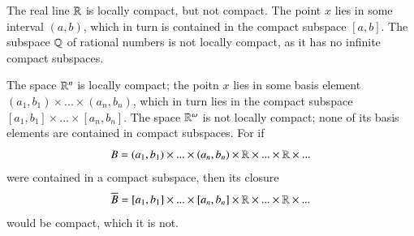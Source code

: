 \documentclass[12pt, a4paper, oneside, openright, titlepage]{book}
\begin{document}
\begin{example}
    The real line $\mathbb R$ is locally compact, but not compact. The point $x$ lies in some interval $(a,b)$, which in turn is contained in the compact subspace $[a,b]$. The subspace $\mathbb Q$ of rational numbers is not locally compact, as it has no infinite compact subspaces.
\end{example}

\begin{example}
    The space $\mathbb R^n$ is locally compact; the poitn $x$ lies in some basis element $(a_1,b_1)\times ... \times (a_n,b_n)$, which in turn lies in the compact subspace $[a_1,b_1]\times ... \times [a_n,b_n]$. The space $\mathbb R^{\omega}$ is not locally compact; none of its basis elements are contained in compact subspaces. For if \begin{equation*}
        B = (a_1,b_1)\times ... \times (a_n,b_n)\times \mathbb R\times ... \times \mathbb R\times ...
    \end{equation*}
    were contained in a compact subspace, then its closure \begin{equation*}
        \overline{B} = [a_1,b_1]\times ... \times [a_n,b_n]\times \mathbb R\times ... \times \mathbb R\times ...
    \end{equation*}
    would be compact, which it is not.
\end{example}
\end{document}
